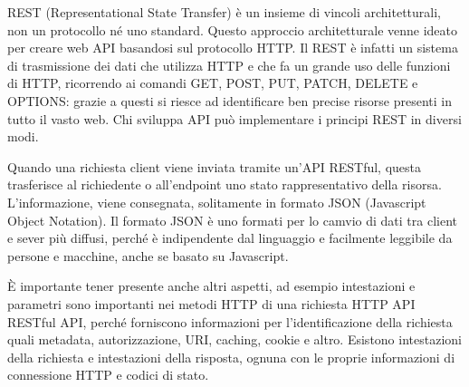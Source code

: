 \documentclass[12pt,a4paper]{article}
\begin{document}
REST (Representational State Transfer) è un insieme di vincoli architetturali, non un protocollo né uno standard. Questo approccio architetturale venne ideato per creare web API basandosi sul protocollo HTTP. Il REST è infatti un sistema di trasmissione dei dati che utilizza HTTP e che fa un grande uso delle funzioni di HTTP, ricorrendo ai comandi GET, POST, PUT, PATCH, DELETE e OPTIONS: grazie a questi si riesce ad identificare ben precise risorse presenti in tutto il vasto web. Chi sviluppa API può implementare i principi REST in diversi modi.

Quando una richiesta client viene inviata tramite un'API RESTful, questa trasferisce al richiedente o all'endpoint uno stato rappresentativo della risorsa. L'informazione, viene consegnata, solitamente in formato JSON (Javascript Object Notation). Il formato JSON è uno formati per lo camvio di dati tra client e sever più diffusi, perché è indipendente dal linguaggio e facilmente leggibile da persone e macchine, anche se basato su Javascript.

È importante tener presente anche altri aspetti, ad esempio intestazioni e parametri sono importanti nei metodi HTTP di una richiesta HTTP API RESTful API, perché forniscono informazioni per l'identificazione della richiesta quali metadata, autorizzazione, URI, caching, cookie e altro. Esistono intestazioni della richiesta e intestazioni della risposta, ognuna con le proprie informazioni di connessione HTTP e codici di stato.
\end{document}
